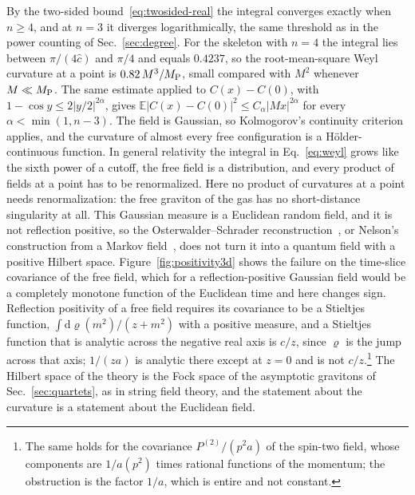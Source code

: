 \documentclass[a4paper,11pt]{article}
\newcommand{\bE}{\mathbb{E}}
\newcommand{\dd}{\mathrm{d}}
\newcommand{\Pt}{P^{(2)}}
\begin{document}
By the two-sided bound~\eqref{eq:twosided-real} the integral converges exactly when $n\ge4$, and at $n=3$ it diverges logarithmically, the same threshold as in the power counting of Sec.~\ref{sec:degree}. For the skeleton with $n=4$ the integral lies between $\pi/(4\hat c)$ and $\pi/4$ and equals $0.4237$, so the root-mean-square Weyl curvature at a point is $0.82\,M^3/M_{\rm P}$, small compared with $M^2$ whenever $M\ll M_{\rm P}$. The same estimate applied to $C(x)-C(0)$, with $1-\cos y\le2|y/2|^{2\alpha}$, gives $\bE|C(x)-C(0)|^2\le C_\alpha|Mx|^{2\alpha}$ for every $\alpha<\min(1,n-3)$. The field is Gaussian, so Kolmogorov's continuity criterion applies, and the curvature of almost every free configuration is a H\"older-continuous function. In general relativity the integral in Eq.~\eqref{eq:weyl} grows like the sixth power of a cutoff, the free field is a distribution, and every product of fields at a point has to be renormalized. Here no product of curvatures at a point needs renormalization: the free graviton of the gas has no short-distance singularity at all. This Gaussian measure is a Euclidean random field, and it is not reflection positive, so the Osterwalder--Schrader reconstruction~\cite{OsterwalderSchrader1973,OsterwalderSchrader1975,GlimmJaffe1987}, or Nelson's construction from a Markov field~\cite{Nelson1973}, does not turn it into a quantum field with a positive Hilbert space. Figure~\ref{fig:positivity3d} shows the failure on the time-slice covariance of the free field, which for a reflection-positive Gaussian field would be a completely monotone function of the Euclidean time and here changes sign. Reflection positivity of a free field requires its covariance to be a Stieltjes function, $\int\dd\varrho(m^2)/(z+m^2)$ with a positive measure, and a Stieltjes function that is analytic across the negative real axis is $c/z$, since $\varrho$ is the jump across that axis; $1/(za)$ is analytic there except at $z=0$ and is not $c/z$.\footnote{The same holds for the covariance $\Pt/(p^2a)$ of the spin-two field, whose components are $1/a(p^2)$ times rational functions of the momentum; the obstruction is the factor $1/a$, which is entire and not constant.} The Hilbert space of the theory is the Fock space of the asymptotic gravitons of Sec.~\ref{sec:quartets}, as in string field theory, and the statement about the curvature is a statement about the Euclidean field.
\end{document}
